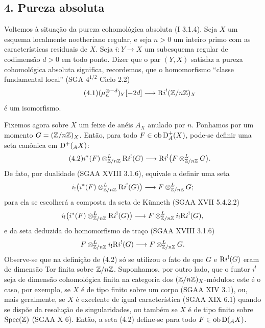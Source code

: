 \subsection*{4. Pureza absoluta}

Voltemos à situação da pureza cohomológica absoluta (I 3.1.4). Seja $X$ um esquema localmente noetheriano regular, e seja $n>0$ um inteiro primo com as características residuais de $X$. Seja $i:Y\to X$ um subesquema regular de codimensão $d>0$ em todo ponto. Dizer que o par $(Y,X)$ satisfaz a pureza cohomológica absoluta significa, recordemos, que o homomorfismo ``classe fundamental local'' (SGA $4^{1/2}$ Ciclo 2.2)
\begin{equation}\tag{4.1}
        (\mu_n^{\otimes -d})_Y[-2d]\longrightarrow \mathrm{R} i^!(\mathbb{Z}/n\mathbb{Z})_X
\end{equation}
é um isomorfismo.

Fixemos agora sobre $X$ um feixe de anéis $A_X$ anulado por $n$. Ponhamos por um momento $G=(\mathbb{Z}/n\mathbb{Z})_X$. Então, para todo $F\in\operatorname{ob}\mathrm{D}_A^+(X)$, pode-se definir uma seta canônica em $\mathrm{D}^+({}_A X)$:
\begin{equation}\tag{4.2}
        i^*(F)\otimes^L_{\mathbb{Z}/n\mathbb{Z}} \mathrm{R} i^!(G)\longrightarrow \mathrm{R} i^!\bigl(F\otimes^L_{\mathbb{Z}/n\mathbb{Z}}G\bigr).
\end{equation}
De fato, por dualidade (SGAA XVIII 3.1.6), equivale a definir uma seta
\[
        i_!\bigl(i^*(F)\otimes^L_{\mathbb{Z}/n\mathbb{Z}}\mathrm{R} i^!(G)\bigr)\longrightarrow F\otimes^L_{\mathbb{Z}/n\mathbb{Z}}G;
\]
para ela se escolherá a composta da seta de Künneth (SGAA XVII 5.4.2.2)
\[
        i_!\bigl(i^*(F)\otimes^L_{\mathbb{Z}/n\mathbb{Z}}\mathrm{R} i^!(G)\bigr)\longrightarrow F\otimes^L_{\mathbb{Z}/n\mathbb{Z}}i_!\mathrm{R} i^!(G),
\]
e da seta deduzida do homomorfismo de traço (SGAA XVIII 3.1.6)
\[
        F\otimes^L_{\mathbb{Z}/n\mathbb{Z}}i_!\mathrm{R} i^!(G)\longrightarrow F\otimes^L_{\mathbb{Z}/n\mathbb{Z}}G.
\]
Observe-se que na definição de (4.2) só se utilizou o fato de que $G$ e $\mathrm{R} i^!(G)$ eram de dimensão Tor finita sobre $\mathbb{Z}/n\mathbb{Z}$. Suponhamos, por outro lado, que o funtor $i^!$ seja de dimensão cohomológica finita na categoria dos $(\mathbb{Z}/n\mathbb{Z})_X$-módulos: este é o caso, por exemplo, se $X$ é de tipo finito sobre um corpo (SGAA XIV 3.1), ou, mais geralmente, se $X$ é excelente de igual característica (SGAA XIX 6.1) quando se dispõe da resolução de singularidades, ou também se $X$ é de tipo finito sobre $\operatorname{Spec}(\mathbb{Z})$ (SGAA X 6). Então, a seta (4.2) define-se para todo $F\in\operatorname{ob}\mathrm{D}({}_A X)$.

